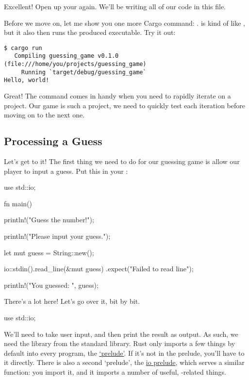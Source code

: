 Excellent! Open up your  again. We’ll be writing all of our code in this file.

\blank

Before we move on, let me show you one more Cargo command: .  is kind of like , 
but it also then runs the produced executable. Try it out:

\begin{verbatim}
$ cargo run
   Compiling guessing_game v0.1.0 (file:///home/you/projects/guessing_game)
     Running `target/debug/guessing_game`
Hello, world!
\end{verbatim}

Great! The  command comes in handy when you need to rapidly iterate on a project. Our game is such a project, we 
need to quickly test each iteration before moving on to the next one.

\subsection{Processing a Guess}

Let’s get to it! The first thing we need to do for our guessing game is allow our player to input a guess. Put this in your 
:

\begin{rustc}
use std::io;

fn main() {
    println!("Guess the number!");

    println!("Please input your guess.");

    let mut guess = String::new();

    io::stdin().read_line(&mut guess)
        .expect("Failed to read line");

    println!("You guessed: {}", guess);
}
\end{rustc}

There’s a lot here! Let’s go over it, bit by bit.

\begin{rustc}
use std::io;
\end{rustc}

We’ll need to take user input, and then print the result as output. As such, we need the  library from the standard 
library. Rust only imports a few things by default into every program, the \href{https://doc.rust-lang.org/std/prelude/}{‘prelude’}.
If it’s not in the prelude, you’ll have to  it directly. There is also a second ‘prelude’, the 
\href{https://doc.rust-lang.org/std/io/prelude/}{io prelude}, which serves a similar function: you import it, and it imports a 
number of useful, -related things.

